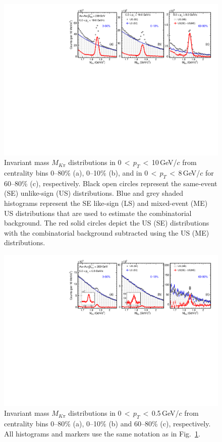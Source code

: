 \documentclass[%
 reprint,	
showpacs,
 amsmath,amssymb,
 aps,
 prc,
]{revtex4-1}
\begin{document}
\begin{figure}
\centering
\includegraphics[width=1.0\textwidth]{fig/signal_0_8_10GeV.pdf}
\caption{Invariant mass $M_{K\pi}$ distributions in 0\,$<$\,$p_{T}$\,$<$\,10\,GeV/$c$ from centrality bins 0--80\% (a), 0--10\% (b), and in 0\,$<$\,$p_{T}$\,$<$\,8\,GeV/$c$ for 60--80\% (c), respectively. Black open circles represent the same-event (SE) unlike-sign (US) distributions. Blue and grey shaded histograms represent the SE like-sign (LS) and mixed-event (ME) US distributions that are used to estimate the combinatorial background. The red solid circles depict the US (SE) distributions with the combinatorial background subtracted using the US (ME) distributions.
}
\label{fig:signal_0} 
\end{figure}

\begin{figure}
\centering
\includegraphics[width=1.0\textwidth]{fig/signal2_0_05GeV.pdf}
\caption{Invariant mass $M_{K\pi}$ distributions in 0\,$<$\,$p_{T}$\,$<$\,0.5\,GeV/$c$ from centrality bins 0--80\% (a), 0--10\% (b) and 60--80\% (c), respectively. All histograms and markers use the same notation as in Fig.~\ref{fig:signal_0}.}
\label{fig:signal_1} 
\end{figure}
\end{document}
